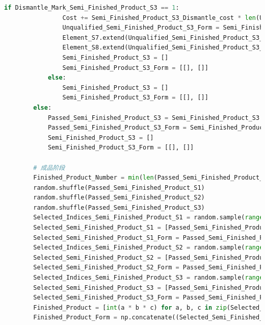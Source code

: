 \documentclass[withoutpreface,bwprint]{cumcmthesis} %
\begin{document}
\begin{appendices}
\begin{lstlisting}[language=python]
			if Dismantle_Mark_Semi_Finished_Product_S3 == 1:
				Cost += Semi_Finished_Product_S3_Dismantle_cost * len(Unqualified_Semi_Finished_Product_S3_Indices)
				Unqualified_Semi_Finished_Product_S3_Form = Semi_Finished_Product_S3_Form[:, Unqualified_Semi_Finished_Product_S3_Indices]
				Element_S7.extend(Unqualified_Semi_Finished_Product_S3_Form[0])
				Element_S8.extend(Unqualified_Semi_Finished_Product_S3_Form[1])
				Semi_Finished_Product_S3 = []
				Semi_Finished_Product_S3_Form = [[], []]
			else:
				Semi_Finished_Product_S3 = []
				Semi_Finished_Product_S3_Form = [[], []]
		else:
			Passed_Semi_Finished_Product_S3 = Semi_Finished_Product_S3
			Passed_Semi_Finished_Product_S3_Form = Semi_Finished_Product_S3_Form
			Semi_Finished_Product_S3 = []
			Semi_Finished_Product_S3_Form = [[], []]
	
		# 成品阶段
		Finished_Product_Number = min(len(Passed_Semi_Finished_Product_S1), len(Passed_Semi_Finished_Product_S2), len(Passed_Semi_Finished_Product_S3))
		random.shuffle(Passed_Semi_Finished_Product_S1)
		random.shuffle(Passed_Semi_Finished_Product_S2)
		random.shuffle(Passed_Semi_Finished_Product_S3)
		Selected_Indices_Semi_Finished_Product_S1 = random.sample(range(len(Passed_Semi_Finished_Product_S1)), Finished_Product_Number)
		Selected_Semi_Finished_Product_S1 = [Passed_Semi_Finished_Product_S1[i] for i in Selected_Indices_Semi_Finished_Product_S1]
		Selected_Semi_Finished_Product_S1_Form = Passed_Semi_Finished_Product_S1_Form[:, Selected_Indices_Semi_Finished_Product_S1]
		Selected_Indices_Semi_Finished_Product_S2 = random.sample(range(len(Passed_Semi_Finished_Product_S2)), Finished_Product_Number)
		Selected_Semi_Finished_Product_S2 = [Passed_Semi_Finished_Product_S2[i] for i in Selected_Indices_Semi_Finished_Product_S2]
		Selected_Semi_Finished_Product_S2_Form = Passed_Semi_Finished_Product_S2_Form[:, Selected_Indices_Semi_Finished_Product_S2]
		Selected_Indices_Semi_Finished_Product_S3 = random.sample(range(len(Passed_Semi_Finished_Product_S3)), Finished_Product_Number)
		Selected_Semi_Finished_Product_S3 = [Passed_Semi_Finished_Product_S3[i] for i in Selected_Indices_Semi_Finished_Product_S3]
		Selected_Semi_Finished_Product_S3_Form = Passed_Semi_Finished_Product_S3_Form[:, Selected_Indices_Semi_Finished_Product_S3]
		Finished_Product = [int(a * b * c) for a, b, c in zip(Selected_Semi_Finished_Product_S1, Selected_Semi_Finished_Product_S2, Selected_Semi_Finished_Product_S3)]
		Finished_Product_Form = np.concatenate((Selected_Semi_Finished_Product_S1_Form, Selected_Semi_Finished_Product_S2_Form, Selected_Semi_Finished_Product_S3_Form), axis=0)

\end{lstlisting}
\end{appendices}
\end{document}
